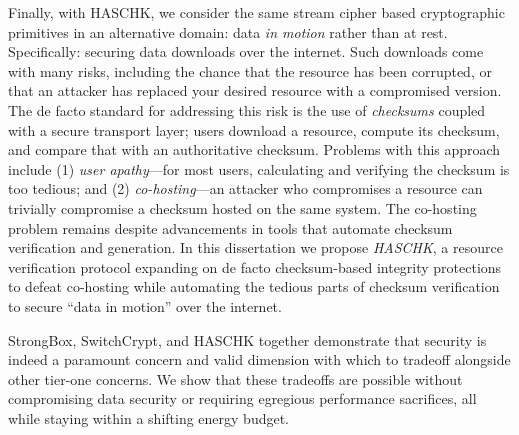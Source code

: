 Finally, with HASCHK, we consider the same stream cipher based cryptographic
primitives in an alternative domain: data \emph{in motion} rather than at rest.
Specifically: securing data downloads over the internet. Such downloads come
with many risks, including the chance that the resource has been corrupted, or
that an attacker has replaced your desired resource with a compromised version.
The de facto standard for addressing this risk is the use of \emph{checksums}
coupled with a secure transport layer; users download a resource, compute its
checksum, and compare that with an authoritative checksum. Problems with this
approach include (1) \emph{user apathy}---for most users, calculating and
verifying the checksum is too tedious; and (2) \emph{co-hosting}---an attacker
who compromises a resource can trivially compromise a checksum hosted on the
same system. The co-hosting problem remains despite advancements in tools that
automate checksum verification and generation. In this dissertation we propose
\emph{HASCHK}, a resource verification protocol expanding on de facto
checksum-based integrity protections to defeat co-hosting while automating the
tedious parts of checksum verification to secure ``data in motion'' over the
internet.

StrongBox, SwitchCrypt, and HASCHK together demonstrate that security is indeed
a paramount concern and valid dimension with which to tradeoff alongside other
tier-one concerns. We show that these tradeoffs are possible without
compromising data security or requiring egregious performance sacrifices, all
while staying within a shifting energy budget.
